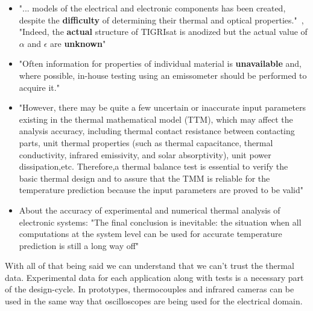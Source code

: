 \documentclass[final]{cubedoc}
\begin{document}
\begin{itemize}
    \item "... models of the electrical and electronic components has been created, despite the \textbf{difficulty} of determining their thermal and optical properties."~\cite{paris2015}, "Indeed, the \textbf{actual} structure of TIGRIsat is anodized but the actual value of $\alpha$  and $\epsilon$ are \textbf{unknown}"~\cite{paris2015}
    \item "Often information for properties of individual material is \textbf{unavailable} and, where possible, in-house testing using an emissometer should be performed to acquire it."~\cite{mccarron2018developing}


    \item "However, there may be quite a few uncertain or inaccurate input parameters existing in the thermal mathematical model (TTM), which may affect the analysis accuracy, including thermal contact resistance between contacting parts, unit thermal properties (such as thermal capacitance, thermal conductivity, infrared emissivity, and solar absorptivity), unit power dissipation,etc. Therefore,a thermal balance test is essential to verify the basic thermal design and to assure that the TMM is reliable for the temperature prediction because the input parameters are proved to be valid"~\cite{tsai2004overview}



    \item About the accuracy of experimental and numerical thermal analysis of electronic systems: "The final conclusion is inevitable: the situation when all computations at the system level can be used for accurate temperature prediction is still a long way off"~\cite{lasance2002}
\end{itemize}

With all of that being said we can understand that we can't trust the thermal data. Experimental data for each application along with tests is a necessary part of the design-cycle. In prototypes, thermocouples and infrared cameras can be used in the same way that oscilloscopes are being used for the electrical domain.
\end{document}
